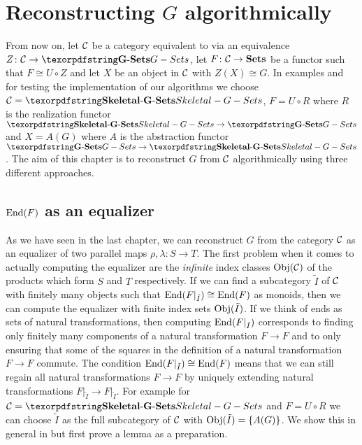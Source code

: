 
\section{Reconstructing \texorpdfstring{$G$}{G} algorithmically}

From now on, let $\mathcal{C}$ be a category equivalent to \Gset{} via an equivalence $Z \colon \Ccal \to \Gset$, let $F\colon \mathcal{C} \to {\ensuremath{{\operatorname{\mathbf{Sets}}}}}$ be a functor such that $F \cong U \circ Z$ and let $X$ be an object in $\mathcal{C}$ with $Z(X) \cong G$. In examples and for testing the implementation of our algorithms we choose $\Ccal = \SkeletalGSets$, $F = U \circ R$ where $R$ is the realization functor $\SkeletalGSets \to \Gset$ and $X = A(G)$ where $A$ is the abstraction functor $\Gset \to \SkeletalGSets$. The aim of this chapter is to reconstruct $G$ from $\mathcal{C}$ algorithmically using three different approaches.

\subsection{\texorpdfstring{$\operatorname{End}(F)$}{End(F)} as an equalizer}

\begin{rem}\label{rem:infinite_index_set}
As we have seen in the last chapter, we can reconstruct $G$ from the category $\mathcal{C}$ as an equalizer of two parallel maps $\rho,\lambda\colon S \to T$. The first problem when it comes to actually computing the equalizer are the \emph{infinite} index classes $\operatorname{Obj}(\mathcal{C})$ of the products which form $S$ and $T$ respectively. If we can find a subcategory $\tilde I$ of $\mathcal{C}$ with finitely many objects such that $\operatorname{End}(F\vert_{\tilde I}) \cong \operatorname{End}(F)$ as monoids, then we can compute the equalizer with finite index sets $\operatorname{Obj}(\tilde I)$. If we think of ends as sets of natural transformations, then computing $\operatorname{End}(F\vert_{\tilde I})$ corresponds to finding only finitely many components of a natural transformation $F \to F$ and to only ensuring that some of the squares in the definition of a natural transformation $F \to F$ commute. The condition $\operatorname{End}(F\vert_{\tilde I}) \cong \operatorname{End}(F)$ means that we can still regain all natural transformations $F \to F$ by uniquely extending natural transformations $F\vert_{\tilde I} \to F\vert_{\tilde I}$. For example for $\Ccal = \SkeletalGSets$ and $F = U \circ R$ we can choose $\tilde I$ as the full subcategory of $\mathcal{C}$ with $\operatorname{Obj}(\tilde I) = \{A(G)\}$. We show this in general in  but first prove a lemma as a preparation.
\end{rem}

